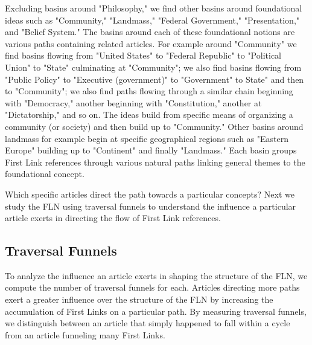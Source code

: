 \documentclass[pre,twocolumn,twoside,superscriptaddress,floatfix, aps, 10pt]{revtex4-1}
\begin{document}
Excluding basins around "Philosophy," we find other basins around 
foundational ideas such as "Community," "Landmass," "Federal Government," 
"Presentation," and "Belief System." 
The basins around each of these foundational notions are 
various paths containing related articles. For example around 
"Community" we find basins
flowing from "United States" to "Federal Republic" to "Political Union" to "State" culminating at "Community"; we also find basins flowing from 
"Public Policy" to "Executive (government)" to "Government" to State" and then 
to "Community"; we also find paths flowing through a similar chain beginning
with "Democracy," another beginning with "Constitution," another at 
"Dictatorship," and so on. The ideas build from specific means of organizing
a community (or society) and then build up to "Community." 
Other basins around landmass for example begin at specific geographical regions
such as "Eastern Europe" building up to "Continent" and finally "Landmass."
Each basin groups First Link references through various 
natural paths linking general themes to the foundational concept.

Which specific articles direct the path towards a particular concepts? 
Next we study the FLN using traversal funnels to understand the influence
a particular article exerts in directing the flow of First Link references.



\subsection{Traversal Funnels}

To analyze the influence an article exerts in shaping the 
structure of the FLN, we compute the number of traversal funnels for each.
Articles directing more paths exert a greater influence over the structure
of the FLN by increasing the accumulation of First Links
on a particular path. By measuring traversal funnels, we distinguish between an article that simply happened to fall within a cycle from an article funneling 
many First Links.
\end{document}
